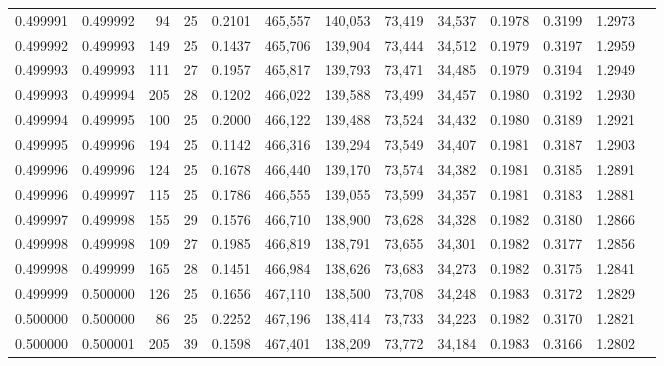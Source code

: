 \begin{tabular}{rrrrrrrrrrrrr}
0.499991 & 0.499992 &  94 &  25 &                                     0.2101 & 465,557 & 140,053 &  73,419 &  34,537 & 0.1978 & 0.3199 & 1.2973 \\
0.499992 & 0.499993 & 149 &  25 &                                     0.1437 & 465,706 & 139,904 &  73,444 &  34,512 & 0.1979 & 0.3197 & 1.2959 \\
0.499993 & 0.499993 & 111 &  27 &                                     0.1957 & 465,817 & 139,793 &  73,471 &  34,485 & 0.1979 & 0.3194 & 1.2949 \\
0.499993 & 0.499994 & 205 &  28 &                                     0.1202 & 466,022 & 139,588 &  73,499 &  34,457 & 0.1980 & 0.3192 & 1.2930 \\
0.499994 & 0.499995 & 100 &  25 &                                     0.2000 & 466,122 & 139,488 &  73,524 &  34,432 & 0.1980 & 0.3189 & 1.2921 \\
0.499995 & 0.499996 & 194 &  25 &                                     0.1142 & 466,316 & 139,294 &  73,549 &  34,407 & 0.1981 & 0.3187 & 1.2903 \\
0.499996 & 0.499996 & 124 &  25 &                                     0.1678 & 466,440 & 139,170 &  73,574 &  34,382 & 0.1981 & 0.3185 & 1.2891 \\
0.499996 & 0.499997 & 115 &  25 &                                     0.1786 & 466,555 & 139,055 &  73,599 &  34,357 & 0.1981 & 0.3183 & 1.2881 \\
0.499997 & 0.499998 & 155 &  29 &                                     0.1576 & 466,710 & 138,900 &  73,628 &  34,328 & 0.1982 & 0.3180 & 1.2866 \\
0.499998 & 0.499998 & 109 &  27 &                                     0.1985 & 466,819 & 138,791 &  73,655 &  34,301 & 0.1982 & 0.3177 & 1.2856 \\
0.499998 & 0.499999 & 165 &  28 &                                     0.1451 & 466,984 & 138,626 &  73,683 &  34,273 & 0.1982 & 0.3175 & 1.2841 \\
0.499999 & 0.500000 & 126 &  25 &                                     0.1656 & 467,110 & 138,500 &  73,708 &  34,248 & 0.1983 & 0.3172 & 1.2829 \\
0.500000 & 0.500000 &  86 &  25 &                                     0.2252 & 467,196 & 138,414 &  73,733 &  34,223 & 0.1982 & 0.3170 & 1.2821 \\
0.500000 & 0.500001 & 205 &  39 &                                     0.1598 & 467,401 & 138,209 &  73,772 &  34,184 & 0.1983 & 0.3166 & 1.2802 \\

\end{tabular}
